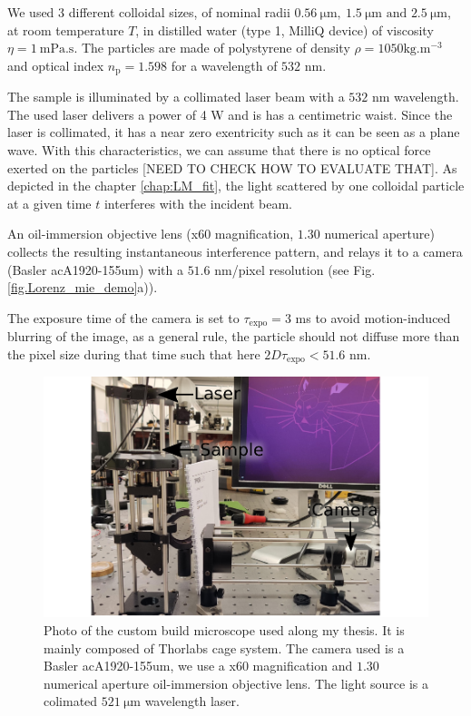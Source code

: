 We used 3 different colloidal sizes, of nominal radii $0.56 ~ \mathrm{\mu m}, ~ 1.5 ~ \mathrm{\mu m} \text{ and } 2.5 ~ \mathrm{\mu m} $, at room temperature $T$, in distilled water (type 1, MilliQ device) of viscosity $\eta = 1 ~ \mathrm{mPa.s}$. The particles are made of polystyrene of density $\rho = 1050 \mathrm{kg.m^{-3}}$ and optical index $n_\mathrm{p} = 1.598$ for a wavelength of $532$ nm.

 The sample is illuminated by a collimated laser beam with a $532$ nm wavelength. The used laser delivers a power of 4 W and is has a centimetric waist. Since the laser is collimated, it has a near zero exentricity such as it can be seen as a plane wave. With this characteristics, we can assume that there is no optical force exerted on the particles [NEED TO CHECK HOW TO EVALUATE THAT]. As depicted in the chapter \ref{chap:LM_fit}, the light scattered by one colloidal particle at a given time $t$ interferes with the incident beam. 
 
 An oil-immersion objective lens (x60 magnification, $1.30$ numerical aperture) collects the resulting instantaneous interference pattern, and relays it to a camera (Basler acA1920-155um) with a $51.6$ nm/pixel resolution (see Fig.\ref{fig.Lorenz_mie_demo}a)). 
 
 The exposure time of the camera is set to $\tau_{\mathrm{expo}} = 3$ ms to avoid motion-induced blurring of the image, as a general rule, the particle should not diffuse more than the pixel size during that time such that here $2D\tau_{\mathrm{expo}} < 51.6$ nm.

\begin{figure}[!ht]
	\centering
	\includegraphics{02_body/chapter2/images/figures_setup/photo_setup.pdf}
	\caption{Photo of the custom build microscope used along my thesis. It is mainly composed of Thorlabs cage system. The camera used is a Basler acA1920-155um, we use a x60 magnification and $1.30$ numerical aperture oil-immersion objective lens. The light source is a colimated  $521 ~ \mathrm{\mu m}$ wavelength laser.}
	\label{fig:picture}
\end{figure}

